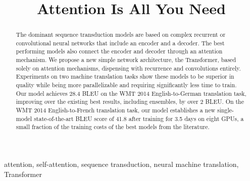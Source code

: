 \documentclass[conference]{IEEEtran}
\begin{document}
\title{Attention Is All You Need}

\author{%
}

\maketitle

\begin{abstract}
The dominant sequence transduction models are based on complex recurrent or
convolutional neural networks that include an encoder and a decoder. The best
performing models also connect the encoder and decoder through an attention
mechanism. We propose a new simple network architecture, the Transformer, based
solely on attention mechanisms, dispensing with recurrence and convolutions
entirely. Experiments on two machine translation tasks show these models to be
superior in quality while being more parallelizable and requiring significantly
less time to train. Our model achieves 28.4 BLEU on the WMT 2014 English-to-German
translation task, improving over the existing best results, including ensembles,
by over 2 BLEU. On the WMT 2014 English-to-French translation task, our model
establishes a new single-model state-of-the-art BLEU score of 41.8 after training
for 3.5 days on eight GPUs, a small fraction of the training costs of the best
models from the literature.
\end{abstract}

\begin{IEEEkeywords}
attention, self-attention, sequence transduction, neural machine translation, Transformer
\end{IEEEkeywords}
\end{document}
